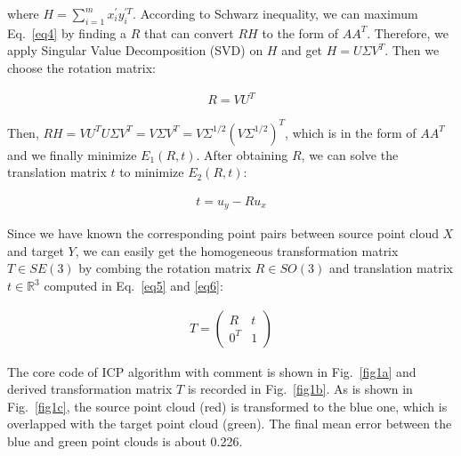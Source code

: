\documentclass[hyperref]{article}
\theoremstyle{nonumberplain}
\begin{document}
where $H=\sum_{i=1}^{m}x_{i}^{'}y_{i}^{'T}$. According to Schwarz inequality, we can maximum Eq.~\ref{eq4} by finding a $R$ that can convert $RH$ to the form of $AA^{T}$. Therefore, we apply Singular Value Decomposition (SVD) on $H$ and get $H=U\Sigma V^{T}$. Then we choose the rotation matrix:

\begin{equation}
\begin{aligned}
R=VU^{T} 
\label{eq5}
\end{aligned}
\end{equation}

Then, $RH=VU^{T}U\Sigma V^{T}=V\Sigma V^{T}=V\Sigma^{1/2}(V\Sigma^{1/2})^{T}$, which is in the form of $AA^{T}$ and we finally minimize $E_{1}(R,t)$. After obtaining $R$, we can solve the translation matrix $t$ to minimize $E_{2}(R,t)$:

\begin{equation}
\begin{aligned}
t=u_{y}-Ru_{x} 
\label{eq6}
\end{aligned}
\end{equation}

Since we have known the corresponding point pairs between source point cloud $X$ and target $Y$, we can easily get the homogeneous transformation matrix $T\in SE(3)$ by combing the rotation matrix $R\in SO(3)$ and translation matrix $t \in \mathbb{R}^{3}$ computed in Eq.~\ref{eq5} and \ref{eq6}:

\begin{equation}
\begin{aligned}
T=\begin{pmatrix}
R &t \\ 
0^{T} &1 
\end{pmatrix}
\label{eq7}
\end{aligned}
\end{equation}

The core code of ICP algorithm with comment is shown in Fig.~\ref{fig1a} and derived transformation matrix $T$ is recorded in Fig.~\ref{fig1b}. As is shown in Fig.~\ref{fig1c}, the source point cloud (red) is transformed to the blue one, which is overlapped with the target point cloud (green). The final mean error between the blue and green point clouds is about 0.226. 
\end{document}
